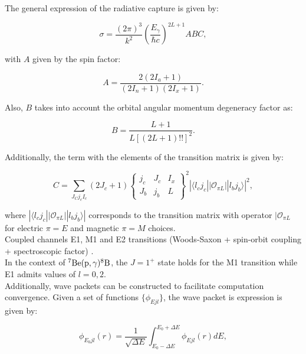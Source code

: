 \documentclass[openany]{book}
\begin{document}
The general expression of the radiative capture is given by:

\begin{equation}\label{eq:potential_radiativeCapture}
	\sigma = \frac{(2\pi)^3}{k^2} \left(\frac{E_\gamma}{\hbar c}\right)^{2L + 1} ABC,
\end{equation}

with $A$ given by the spin factor:

\begin{equation}\label{eq:potential_radiativeCapture_A}
	A = \frac{2(2I_a + 1)}{(2I_n + 1)(2I_x + 1)}.
\end{equation}

Also, $B$ takes into account the orbital angular momentum degeneracy factor as: 

\begin{equation}\label{eq:potential_radiativeCapture_B}
	B =  \frac{L+1}{L[(2L+1)!!]^2}.
\end{equation}

Additionally, the term with the elements of the transition matrix is given by:

\begin{equation}\label{eq:potential_radiativeCapture_C}
	C =  \sum_{J_Cj_cI_c} (2J_c + 1) \left \{  \begin{matrix}
		j_c & J_c & I_x \\
		J_b & j_b & L
	\end{matrix} \right \}^2 |\langle l_cj_c || \mathcal{O}_{\pi L} || l_b j_b \rangle|^2,
\end{equation}

where $|\langle l_cj_c || \mathcal{O}_{\pi L} || l_b j_b \rangle|$ corresponds to the transition matrix with operator $| \mathcal{O}_{\pi L}$ for electric $\pi = E$ and magnetic $\pi = M$ choices.\\

Coupled channels  E1, M1 and E2 transitions (Woods-Saxon + spin-orbit coupling + spectroscopic factor) \cite{bertulani_1996}. \\

In the context of $\mathrm{{}^{7}Be(p, \gamma){}^{8}B}$, the $J = 1^+$ state holds for the M1 transition while E1 admits values of $l=0, 2$. \\

Additionally, wave packets can be constructed to facilitate computation convergence. Given a set of functions $\{\phi_{Ejl}\}$, the wave packet is expression is given by:

\begin{equation}\label{eq:potential_wavePacket}
	\phi_{E_0jl}(r) = \frac{1}{\sqrt{\Delta E}} \int_{E_0 - \Delta E}^{E_0 + \Delta E} {\phi_{Ejl}(r)dE},
\end{equation}
\end{document}
